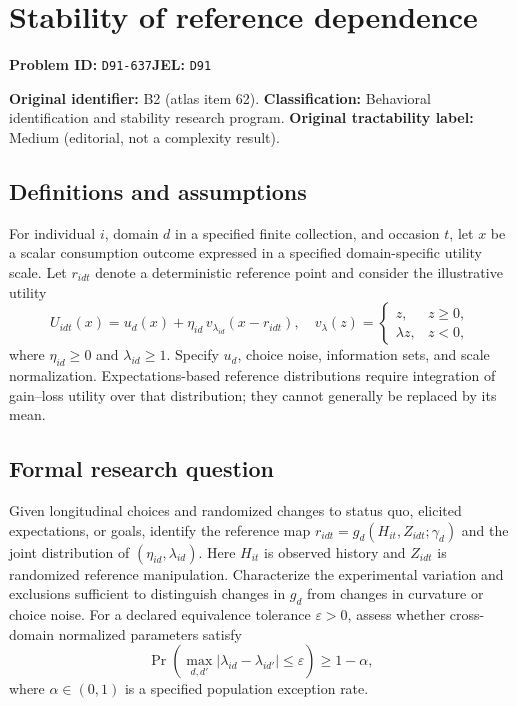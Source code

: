 \documentclass[11pt,a4paper]{article}
\begin{document}
\section*{Stability of reference dependence}
\textbf{Problem ID:} \texttt{D91-637}\quad \textbf{JEL:} \texttt{D91}\par
\label{problem:OP-0062}
\label{atlas:prob:B2}

\noindent\textbf{Original identifier:} B2 (atlas item 62). \textbf{Classification:} Behavioral identification and stability research program. \textbf{Original tractability label:} Medium (editorial, not a complexity result).

\subsection*{Definitions and assumptions}

For individual $i$, domain $d$ in a specified finite collection, and occasion $t$, let $x$ be a scalar consumption outcome expressed in a specified domain-specific utility scale. Let $r_{idt}$ denote a deterministic reference point and consider the illustrative utility
\[
U_{idt}(x)=u_d(x)+\eta_{id}\,v_{\lambda_{id}}(x-r_{idt}),\quad
v_\lambda(z)=\begin{cases}z,&z\geq0,\\ \lambda z,&z<0,\end{cases}
\]
where $\eta_{id}\geq0$ and $\lambda_{id}\geq1$. Specify $u_d$, choice noise, information sets, and scale normalization. Expectations-based reference distributions require integration of gain--loss utility over that distribution; they cannot generally be replaced by its mean.

\subsection*{Formal research question}

Given longitudinal choices and randomized changes to status quo, elicited expectations, or goals, identify the reference map $r_{idt}=g_d(H_{it},Z_{idt};\gamma_d)$ and the joint distribution of $(\eta_{id},\lambda_{id})$. Here $H_{it}$ is observed history and $Z_{idt}$ is randomized reference manipulation. Characterize the experimental variation and exclusions sufficient to distinguish changes in $g_d$ from changes in curvature or choice noise. For a declared equivalence tolerance $\varepsilon>0$, assess whether cross-domain normalized parameters satisfy
\[
\Pr\!\left(\max_{d,d'}|\lambda_{id}-\lambda_{id'}|\leq\varepsilon\right)\geq1-\alpha,
\]
where $\alpha\in(0,1)$ is a specified population exception rate.
\end{document}
